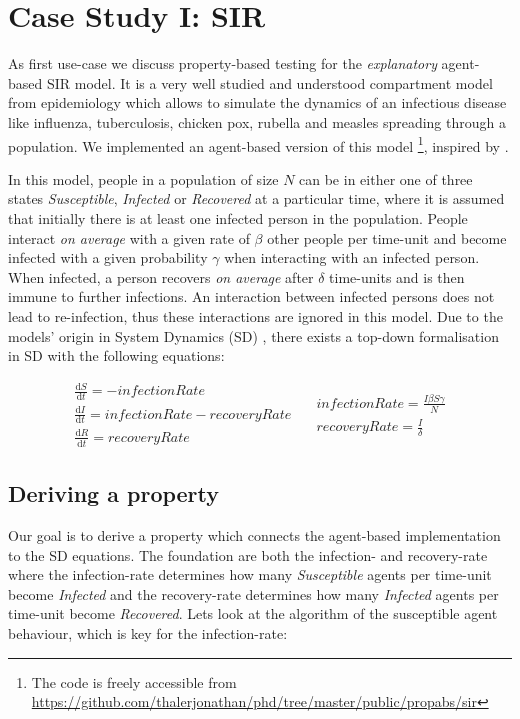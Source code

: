 \section{Case Study I: SIR}
\label{sec:case_SIR}
As first use-case we discuss property-based testing for the \textit{explanatory} agent-based SIR model. It is a very well studied and understood compartment model from epidemiology \cite{kermack_contribution_1927} which allows to simulate the dynamics of an infectious disease like influenza, tuberculosis, chicken pox, rubella and measles spreading through a population. We implemented an agent-based version of this model \footnote{The code is freely accessible from \url{https://github.com/thalerjonathan/phd/tree/master/public/propabs/sir}}, inspired by \cite{macal_agent-based_2010}.

In this model, people in a population of size $N$ can be in either one of three states \textit{Susceptible}, \textit{Infected} or \textit{Recovered} at a particular time, where it is assumed that initially there is at least one infected person in the population. People interact \textit{on average} with a given rate of $\beta$ other people per time-unit and become infected with a given probability $\gamma$ when interacting with an infected person. When infected, a person recovers \textit{on average} after $\delta$ time-units and is then immune to further infections. An interaction between infected persons does not lead to re-infection, thus these interactions are ignored in this model. Due to the models' origin in System Dynamics (SD) \cite{porter_industrial_1962}, there exists a top-down formalisation in SD with the following equations:

\begin{equation}
\begin{split}
\frac{\mathrm d S}{\mathrm d t} = -infectionRate \\
\frac{\mathrm d I}{\mathrm d t} = infectionRate - recoveryRate \\
\frac{\mathrm d R}{\mathrm d t} = recoveryRate 
\end{split}
\quad
\begin{split}
infectionRate = \frac{I \beta S \gamma}{N} \\
recoveryRate = \frac{I}{\delta} 
\end{split}
\end{equation}

\subsection{Deriving a property}
Our goal is to derive a property which connects the agent-based implementation to the SD equations. The foundation are both the infection- and recovery-rate where the infection-rate determines how many \textit{Susceptible} agents per time-unit become \textit{Infected} and the recovery-rate determines how many \textit{Infected} agents per time-unit become \textit{Recovered}. Lets look at the algorithm of the susceptible agent behaviour, which is key for the infection-rate:

